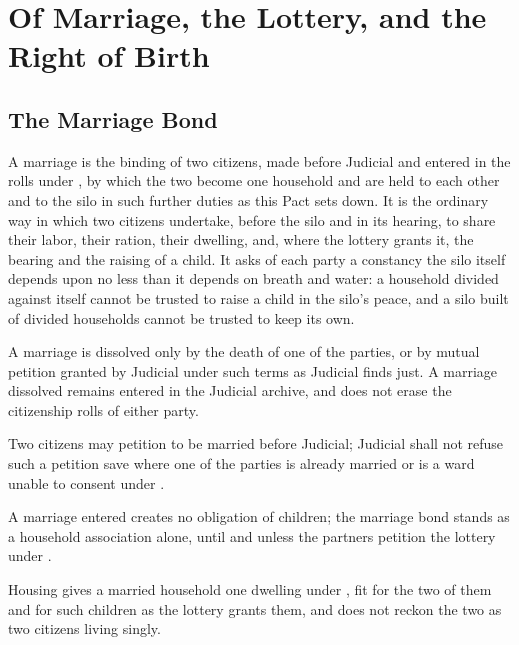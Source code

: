 \chapter{Of Marriage, the Lottery, and the Right of Birth}
\label{art:marriage}


\section{The Marriage Bond}
\label{sec:marriage:marriage-bond}

A marriage is the binding of two citizens, made before Judicial and entered in the rolls under , by which the two become one household and are held to each other and to the silo in such further duties as this Pact sets down. It is the ordinary way in which two citizens undertake, before the silo and in its hearing, to share their labor, their ration, their dwelling, and, where the lottery grants it, the bearing and the raising of a child. It asks of each party a constancy the silo itself depends upon no less than it depends on breath and water: a household divided against itself cannot be trusted to raise a child in the silo's peace, and a silo built of divided households cannot be trusted to keep its own.

\begin{clauses}
\item A marriage is dissolved only by the death of one of the parties, or by mutual petition granted by Judicial under such terms as Judicial finds just. A marriage dissolved remains entered in the Judicial archive, and does not erase the citizenship rolls of either party.
\item Two citizens may petition to be married before Judicial; Judicial shall not refuse such a petition save where one of the parties is already married or is a ward unable to consent under .
\item A marriage entered creates no obligation of children; the marriage bond stands as a household association alone, until and unless the partners petition the lottery under .
\item Housing gives a married household one dwelling under , fit for the two of them and for such children as the lottery grants them, and does not reckon the two as two citizens living singly.
\end{clauses}

